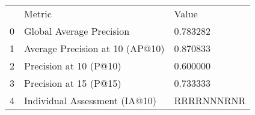 \begin{tabular}{lll}
 & Metric & Value \\
0 & Global Average Precision & 0.783282 \\
1 & Average Precision at 10 (AP@10) & 0.870833 \\
2 & Precision at 10 (P@10) & 0.600000 \\
3 & Precision at 15 (P@15) & 0.733333 \\
4 & Individual Assessment (IA@10) & RRRRNNNRNR \\
\end{tabular}
